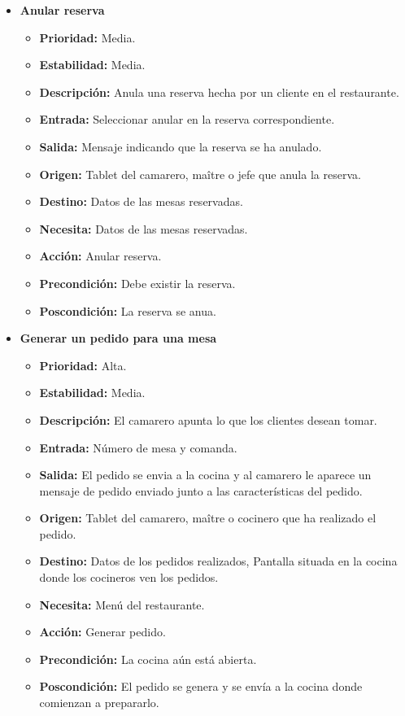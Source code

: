 \documentclass[spanish,a4paper,11pt, twoside]{report}	%
\begin{document}
\begin{itemize}
\begin{itemize}
		\end{itemize}%

\item \textbf{Anular reserva} %

		\begin{itemize}
			\item \textbf{Prioridad: } Media.
			\item \textbf{Estabilidad: } Media.
			\item \textbf{Descripción: } Anula una reserva hecha por un cliente en el restaurante.
			\item \textbf{Entrada: } Seleccionar anular en la reserva correspondiente.
			\item \textbf{Salida: } Mensaje indicando que la reserva se ha anulado.
			\item \textbf{Origen: } Tablet del camarero, maître o jefe que anula la reserva.
			\item \textbf{Destino: } Datos de las mesas reservadas.
			\item \textbf{Necesita: } Datos de las mesas reservadas.
			\item \textbf{Acción: } Anular reserva.
			\item \textbf{Precondición: } Debe existir la reserva.
			\item \textbf{Poscondición: } La reserva se anua.

		\end{itemize}%

	\item \textbf{Generar un pedido para una mesa} %

		\begin{itemize}
			\item \textbf{Prioridad: } Alta.
			\item \textbf{Estabilidad: } Media.
			\item \textbf{Descripción: } El camarero apunta lo que los clientes desean tomar.
			\item \textbf{Entrada: } Número de mesa y comanda.
			\item \textbf{Salida: } El pedido se envia a la cocina y al camarero le aparece un mensaje de pedido enviado junto a las características del pedido.
			\item \textbf{Origen: } Tablet del camarero, maître o cocinero que ha realizado el pedido.
			\item \textbf{Destino: } Datos de los pedidos realizados, Pantalla situada en la cocina donde los cocineros ven los pedidos.
			\item \textbf{Necesita: } Menú del restaurante.
			\item \textbf{Acción: } Generar pedido.
			\item \textbf{Precondición: } La cocina aún está abierta.
			\item \textbf{Poscondición: } El pedido se genera y se envía a la cocina donde comienzan a prepararlo.


\end{itemize}
\end{itemize}
\end{document}
